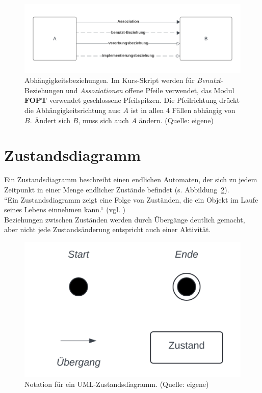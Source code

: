 \begin{figure}
    \centering
    \includegraphics[scale=0.4]{chapters/Anhang/CheatSheets/img/umldependencies}
    \caption{Abhängigkeitsbeziehungen. Im Kurs-Skript werden für \textit{Benutzt}-Beziehungen und \textit{Assoziationen} offene Pfeile verwendet, das Modul \textbf{FOPT} verwendet geschlossene Pfeilspitzen.
    Die Pfeilrichtung drückt die Abhängigkeitsrichtung aus: $A$ ist in allen 4 Fällen abhängig von $B$. Ändert sich $B$, muss sich auch $A$ ändern. (Quelle: eigene)}
    \label{fig:umldependencies}
\end{figure}


\section{Zustandsdiagramm}
Ein Zustandsdiagramm beschreibt einen endlichen Automaten, der sich zu jedem Zeitpunkt in einer Menge endlicher Zustände befindet (s. Abbildung~\ref{fig:zustandsdiagramm}).\\
``Ein Zustandsdiagramm zeigt eine Folge von Zuständen, die ein Objekt im Laufe seines Lebens einnehmen kann.`` (vgl. \cite[391]{Oes05})\\

\noindent
Beziehungen zwischen Zuständen werden durch Übergänge deutlich gemacht, aber nicht jede Zustandsänderung entspricht auch einer Aktivität.


\begin{figure}
    \centering
    \includegraphics[scale=0.4]{chapters/Anhang/CheatSheets/img/zustandsdiagramm}
    \caption{Notation für ein UML-Zustandsdiagramm. (Quelle: eigene)}
    \label{fig:zustandsdiagramm}
\end{figure}


